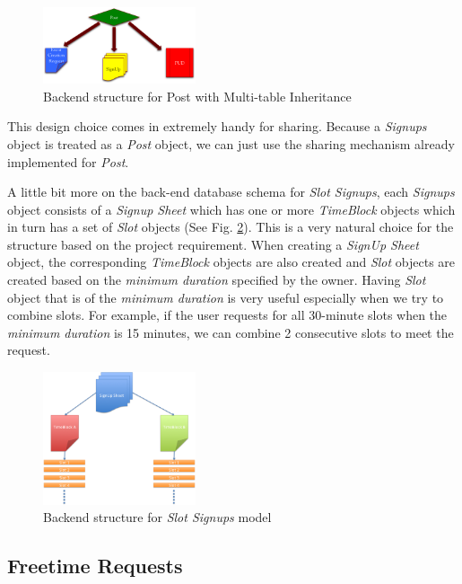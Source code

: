 \documentclass[a4paper]{article}
\begin{document}
\begin{figure}[h]
\centering
\includegraphics[width=0.4\textwidth]{post_structure.png}
\caption{\label{fig:post_struc}Backend structure for Post with Multi-table Inheritance}
\end{figure}

This design choice comes in extremely handy for sharing. Because a \emph{Signups} object is treated as a \emph{Post} object, we can just use the sharing mechanism already implemented for \emph{Post}. 

A little bit more on the back-end database schema for \emph{Slot Signups}, each \emph{Signups} object consists of a \emph{Signup Sheet} which has one or more \emph{TimeBlock} objects which in turn has a set of \emph{Slot} objects (See Fig. \ref{fig:signup}). This is a very natural choice for the structure based on the project requirement. When creating a \emph{SignUp Sheet} object, the corresponding \emph{TimeBlock} objects are also created and \emph{Slot} objects are created based on the \emph{minimum duration} specified by the owner. Having \emph{Slot} object that is of the \emph{minimum duration} is very useful especially when we try to combine slots. For example, if the user requests for all 30-minute slots when the \emph{minimum duration} is 15 minutes, we can combine 2 consecutive slots to meet the request.


\begin{figure}[h]
\centering
\includegraphics[width=0.4\textwidth]{signup.png}
\caption{\label{fig:signup} Backend structure for \emph{Slot Signups} model}
\end{figure}



\subsection{Freetime Requests}
\end{document}
